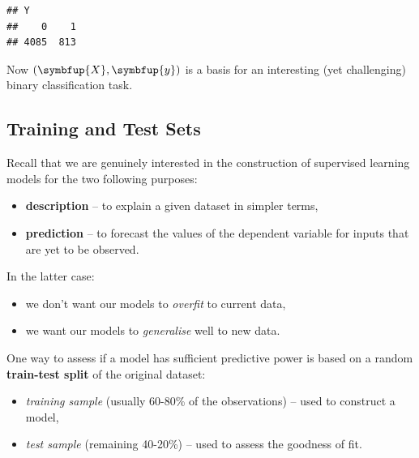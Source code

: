 \documentclass[10pt,b5paper,krantz1]{krantz}
\newenvironment{Shaded}{\begin{snugshade}}{\end{snugshade}}
\newcommand{\CommentTok}[1]{\textcolor[rgb]{0.37,0.37,0.37}{\textit{#1}}}
\newcommand{\DecValTok}[1]{\textcolor[rgb]{0.06,0.06,0.06}{#1}}
\newcommand{\KeywordTok}[1]{\textcolor[rgb]{0.27,0.27,0.27}{\textbf{#1}}}
\newcommand{\NormalTok}[1]{#1}
\newcommand{\OperatorTok}[1]{\textcolor[rgb]{0.43,0.43,0.43}{\textbf{#1}}}
\newcommand{\StringTok}[1]{\textcolor[rgb]{0.5,0.5,0.5}{#1}}
\providecommand{\tightlist}{%
  \setlength{\itemsep}{0pt}\setlength{\parskip}{0pt}}
\renewcommand{\mathbf}[1]{\symbfup{#1}}
\begin{document}
\begin{Shaded}
\end{Shaded}

\begin{verbatim}
## Y
##    0    1 
## 4085  813
\end{verbatim}

Now \((\mathbf{X},\mathbf{y})\) is a basis for an interesting (yet challenging)
binary classification task.

\hypertarget{training-and-test-sets}{%
\subsection{Training and Test Sets}\label{training-and-test-sets}}

Recall that we are genuinely interested in the construction of supervised learning models for the two following purposes:

\begin{itemize}
\tightlist
\item
  \textbf{description} -- to explain a given dataset in simpler terms,
\item
  \textbf{prediction} -- to forecast the values of the dependent variable
  for inputs that are yet to be observed.
\end{itemize}

In the latter case:

\begin{itemize}
\tightlist
\item
  we don't want our models to \emph{overfit} to current data,
\item
  we want our models to \emph{generalise} well
  to new data.
\end{itemize}

\bigskip

One way to assess if a model has sufficient predictive power is based
on a random \textbf{train-test split} of the original dataset:

\begin{itemize}
\tightlist
\item
  \emph{training sample} (usually 60-80\% of the observations) -- used to construct a model,
\item
  \emph{test sample} (remaining 40-20\%) -- used to assess the goodness of fit.
\end{itemize}
\end{document}
